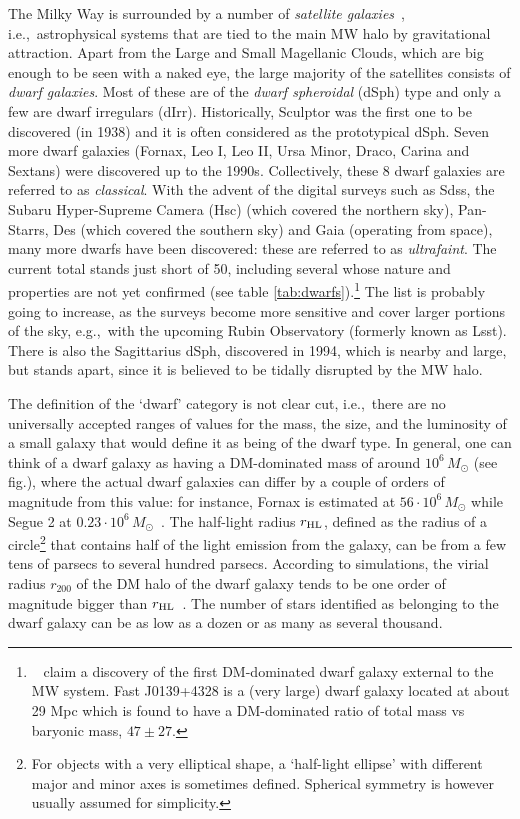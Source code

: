 The Milky Way is surrounded by a number of {\it satellite galaxies}~\cite{dwarfgalaxies}, i.e.,~astrophysical systems that are tied to the main MW halo by gravitational attraction. Apart from the Large and Small Magellanic Clouds, which are big enough to be seen with a naked eye, the large majority of the satellites consists of {\it dwarf galaxies}. 
Most of these are of the {\it dwarf spheroidal} (dSph) type and only a few are dwarf irregulars (dIrr). 
Historically, Sculptor was the first one to be discovered (in 1938) and it is often considered as the prototypical dSph. Seven more dwarf galaxies (Fornax, Leo I, Leo II, Ursa Minor, Draco, Carina and Sextans) were discovered up to the 1990s. Collectively, these 8 dwarf galaxies are referred to as {\it classical}. With the advent of the digital surveys such as {\sc Sdss}, the Subaru Hyper-Supreme Camera ({\sc Hsc}) (which covered the northern sky), {\sc Pan-Starrs}, {\sc Des} (which covered the southern sky) and {\sc Gaia} (operating from space), many more dwarfs have been discovered: these are referred to as {\it ultrafaint}. The current total stands just short of 50, including several whose nature and properties are not yet confirmed  (see table \ref{tab:dwarfs}).\footnote{
~\cite{2302.02646} claim a discovery of the first DM-dominated dwarf galaxy external to the MW system. {\sc Fast} J0139+4328 is a (very large) dwarf galaxy located at about 29 Mpc which is found to have a DM-dominated ratio of total mass vs baryonic mass, $47\pm 27$.} The list is probably going to increase, as the surveys become more sensitive and cover larger portions of the sky, e.g.,~with the upcoming Rubin Observatory (formerly known as {\sc Lsst}). There is also the Sagittarius dSph, discovered in 1994, which is nearby and large, but stands apart, since it is believed to be tidally disrupted by the MW halo. 

The definition of the `dwarf' category is not clear cut, i.e.,~there are no universally accepted ranges of values for the mass, the size, and the luminosity of a small galaxy that would define it as being of the dwarf type. 
In general, one can think of a dwarf galaxy as having a DM-dominated mass of around $10^6 \, M_\odot$ (see fig.),
where the actual dwarf galaxies can differ by a couple of orders of magnitude from this value: for instance, Fornax is estimated at $56 \cdot 10^6 \, M_\odot$ while Segue 2 at $0.23 \cdot 10^6 \, M_\odot$~\cite{dwarfgalaxies}. 
The half-light radius $r_{\rm HL}$, defined as the radius of a circle\footnote{For objects with a very elliptical shape, a `half-light ellipse' with different major and minor axes is sometimes defined. Spherical symmetry is however usually assumed for simplicity.} that contains half of the light emission from the galaxy, can be from a few tens of parsecs to several hundred parsecs. According to simulations, the virial radius $r_{200}$ of the DM halo of the dwarf galaxy tends to be one order of magnitude bigger than $r_{\rm HL}$~\cite{1801.06222}. The number of stars identified as belonging to the dwarf galaxy can be as low as a dozen or as many as several thousand. 



